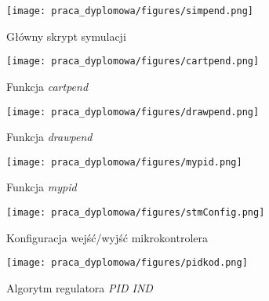 \begin{figure}[tp]
    \centering
    \texttt{[image: praca\_dyplomowa/figures/simpend.png]}
    \caption{Główny skrypt symulacji}
    \label{fig:simpend}
\end{figure}

\begin{figure}
    \centering
    \texttt{[image: praca\_dyplomowa/figures/cartpend.png]}
    \caption{Funkcja \textit{cartpend}}
    \label{fig:cartpend}
\end{figure}

\begin{figure}
    \centering
    \texttt{[image: praca\_dyplomowa/figures/drawpend.png]}
    \caption{Funkcja \textit{drawpend}}
    \label{fig:drawpend}
\end{figure}

\begin{figure}
    \centering
    \texttt{[image: praca\_dyplomowa/figures/mypid.png]}
    \caption{Funkcja \textit{mypid}}
    \label{fig:mypid}
\end{figure}

\begin{figure}
    \centering
    \texttt{[image: praca\_dyplomowa/figures/stmConfig.png]}
    \caption{Konfiguracja wejść/wyjść mikrokontrolera}
    \label{fig:stmconfig}
\end{figure}

\begin{figure}
    \centering
    \texttt{[image: praca\_dyplomowa/figures/pidkod.png]}
    \caption{Algorytm regulatora \textit{PID IND}}
    \label{fig:pidind}
\end{figure}